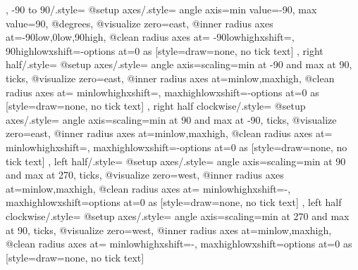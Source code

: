 {{{{      }
    }
  },
  -90 to 90/.style={
    @setup axes/.style={
      angle axis={min value=-90, max value=90},
      @degrees,
      @visualize zero=east,
      @inner radius axes at={{-90}{low},{0}{low},{90}{high}},
      @clean radius axes at={%
        {-90}{low}{high}{xshift=}{},%
        {90}{high}{low}{xshift=-}{options at=0 as
          [{style={draw=none}, no tick text}]}
      }
    }
  },
  right half/.style={
    @setup axes/.style={
      angle axis={scaling=min at -90 and max at 90, ticks},
      @visualize zero=east,
      @inner radius axes at={{min}{low},{max}{high}},
      @clean radius axes at={%
        {min}{low}{high}{xshift=}{},%
        {max}{high}{low}{xshift=-}{options at=0 as
          [{style={draw=none}, no tick text}]}
      }
    }
  },
  right half clockwise/.style={
    @setup axes/.style={
      angle axis={scaling=min at 90 and max at -90, ticks},
      @visualize zero=east,
      @inner radius axes at={{min}{low},{max}{high}},
      @clean radius axes at={%
        {min}{low}{high}{xshift=}{},%
        {max}{high}{low}{xshift=-}{options at=0 as
          [{style={draw=none}, no tick text}]}
      }
    }
  },
  left half/.style={
    @setup axes/.style={
      angle axis={scaling=min at 90 and max at 270, ticks},
      @visualize zero=west,
      @inner radius axes at={{min}{low},{max}{high}},
      @clean radius axes at={%
        {min}{low}{high}{xshift=-}{},%
        {max}{high}{low}{xshift=}{options at=0 as
          [{style={draw=none}, no tick text}]}
      }
    }
  },
  left half clockwise/.style={
    @setup axes/.style={
      angle axis={scaling=min at 270 and max at 90, ticks},
      @visualize zero=west,
      @inner radius axes at={{min}{low},{max}{high}},
      @clean radius axes at={%
        {min}{low}{high}{xshift=-}{},%
        {max}{high}{low}{xshift=}{options at=0 as
          [{style={draw=none}, no tick text}]}
}}}}

